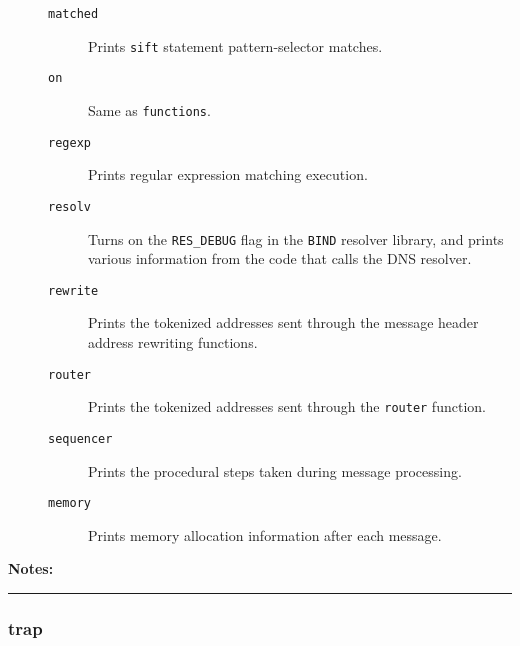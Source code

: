 \begin{description}
\begin{description}
\item[{\tt matched}] \mbox{}

Prints {\tt sift} statement 
pattern-selector matches. 

\item[{\tt on}] \mbox{}

Same as {\tt functions}. 

\item[{\tt regexp}] \mbox{}

Prints regular expression matching execution. 

\item[{\tt resolv}] \mbox{}

Turns on the {\tt RES\_DEBUG} flag in the 
{\tt BIND} resolver library, and prints various information 
from the code that calls the DNS resolver. 

\item[{\tt rewrite}] \mbox{}

Prints the tokenized addresses sent through 
the message header address rewriting functions. 

\item[{\tt router}] \mbox{}

Prints the tokenized addresses sent through 
the {\tt router} function. 

\item[{\tt sequencer}] \mbox{}

Prints the procedural steps taken during 
message processing. 

\item[{\tt memory}] \mbox{}

Prints memory allocation information after 
each message. 

\end{description}


\item[{\bf Notes:}] \mbox{}

 

\end{description}


\hrule
\subsubsection{trap}

